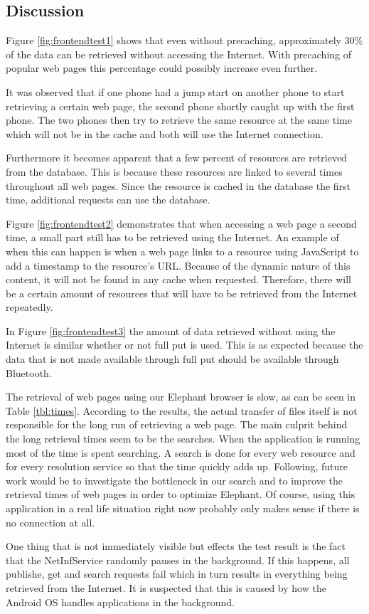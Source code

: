 \subsection{Discussion}

Figure \ref{fig:frontendtest1} shows that even without precaching, approximately 30\% of the data 
can be retrieved without accessing the Internet. With precaching of popular web pages this percentage could 
possibly increase even further.

It was observed that if one phone had a jump start on another phone to start retrieving a certain web page, 
the second phone shortly caught up with the first phone. The two phones then try to retrieve the same resource 
at the same time which will not be in the cache and both will use the Internet connection.

Furthermore it becomes apparent that a few percent of resources are retrieved from the 
database. This is because these resources are linked to several times throughout all web pages. 
Since the resource is cached in the database the first time, additional requests can use the database.

Figure \ref{fig:frontendtest2} demonstrates that when accessing a web page a second time, a small part still has to be 
retrieved using the Internet. An example of when this can happen is when a web page links to a resource using JavaScript 
to add a timestamp to the resource's URL. Because of the dynamic nature of this content, it will not be found in any cache when 
requested. Therefore, there will be a certain amount of resources that will have to be retrieved from the Internet repeatedly.

In Figure \ref{fig:frontendtest3} the amount of data retrieved without using the Internet is similar 
whether or not full put is used. This is as expected because the data that is not made available through full put should 
be available through Bluetooth. 

The retrieval of web pages using our Elephant browser is slow, as can be seen in Table \ref{tbl:times}.
According to the results, the actual transfer of files itself is not responsible for the
long run of retrieving a web page. The main culprit behind the long retrieval 
times seem to be the searches. When the application is running most of the time is spent 
searching. A search is done for every web resource and for every resolution service so that the time quickly adds up. 
Following, future work would be to investigate the bottleneck in our search and to improve the retrieval times of 
web pages in order to optimize Elephant. Of course, using this application in a real 
life situation right now probably only makes sense if there is no connection at all. 

One thing that is not immediately visible but effects the test result is the fact that the NetInfService randomly pauses in 
the background. If this happens, all publishe, get and search requests fail which in turn results in everything being 
retrieved from the Internet. It is suspected that this is caused by how the Android OS handles applications in the background.
